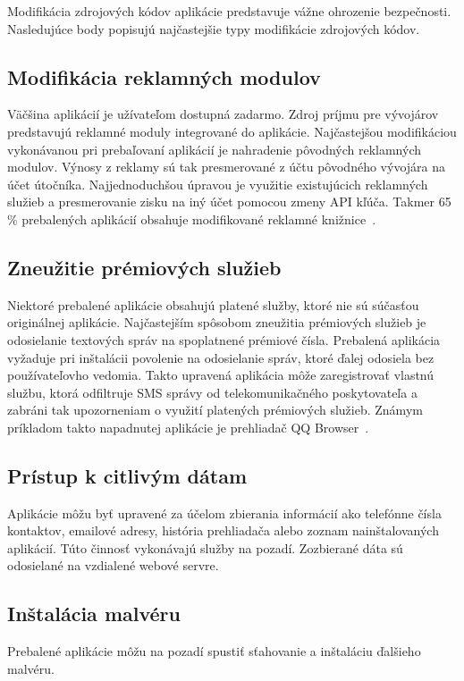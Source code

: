 Modifikácia zdrojových kódov aplikácie predstavuje vážne ohrozenie bezpečnosti. Nasledujúce body popisujú najčastejšie typy modifikácie zdrojových kódov.

\subsection*{Modifikácia reklamných modulov}
Väčšina aplikácií je užívateľom dostupná zadarmo. Zdroj príjmu pre vývojárov predstavujú reklamné moduly integrované do aplikácie. Najčastejšou modifikáciou vykonávanou pri prebaľovaní aplikácií je nahradenie pôvodných reklamných modulov. Výnosy z reklamy sú tak presmerované z účtu pôvodného vývojára na účet útočníka. Najjednoduchšou úpravou je využitie existujúcich reklamných služieb a presmerovanie zisku na iný účet pomocou zmeny API kľúča. Takmer 65 \% prebalených aplikácií obsahuje modifikované reklamné knižnice~\cite{fakeapps}.

\subsection*{Zneužitie prémiových služieb}
Niektoré prebalené aplikácie obsahujú platené služby, ktoré nie sú súčasťou originálnej aplikácie. Najčastejším spôsobom zneužitia prémiových služieb je odosielanie textových správ na spoplatnené prémiové čísla. Prebalená aplikácia vyžaduje pri inštalácii povolenie na odosielanie správ, ktoré ďalej odosiela bez používateľovho vedomia. Takto upravená aplikácia môže zaregistrovať vlastnú službu, ktorá odfiltruje SMS správy od telekomunikačného poskytovateľa a zabráni tak upozorneniam o využití platených prémiových služieb. Známym príkladom takto napadnutej aplikácie je prehliadač QQ Browser~\cite{fakeapps}.

\subsection*{Prístup k citlivým dátam}
Aplikácie môžu byť upravené za účelom zbierania informácií ako telefónne čísla kontaktov, emailové adresy, história prehliadača alebo zoznam nainštalovaných aplikácií. Túto činnosť vykonávajú služby na pozadí. Zozbierané dáta sú odosielané na vzdialené webové servre. 

\subsection*{Inštalácia malvéru}
Prebalené aplikácie môžu na pozadí spustiť sťahovanie a inštaláciu ďalšieho malvéru. 

